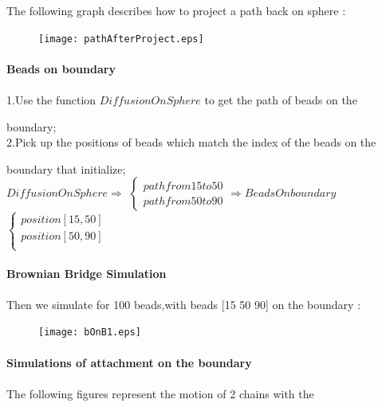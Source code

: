 \documentclass{article}
\begin{document}
The following graph describes how to project a path back on sphere :\\
\begin{figure}[H]
	\texttt{[image: pathAfterProject.eps]}
\end{figure}
\paragraph{Beads on boundary}
\paragraph{}
1.Use the function $DiffusionOnSphere$ to get the path of beads on the

 boundary;\\

2.Pick up the positions of beads which match the index of the beads on the 

boundary that initialize;\\


$DiffusionOnSphere \Longrightarrow $
$\begin{cases}
path from 15 to 50 \\ path from 50 to 90
\end{cases} \Longrightarrow BeadsOnboundary$
$\begin{cases}
position [15,50]\\
position [50,90]\\
\end{cases}$

\pagebreak
\paragraph{Brownian Bridge Simulation}
\paragraph{}
Then we simulate for 100 beads,with beads [15 50 90] on the boundary :\\
\begin{figure}[H]
\centering
\texttt{[image: bOnB1.eps]}	
\end{figure}
\paragraph{Simulations of attachment on the boundary}
\paragraph{}
The following figures represent the motion of 2 chains with the 
\end{document}
